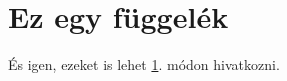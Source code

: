 \documentclass[a4paper, 12pt]{article}
\numberwithin{equation}{section}          %
\numberwithin{figure}{subsection}
\begin{document}

\newpage \vspace*{2cm}

\pagestyle{fancy}

\appendix
\section{Ez egy függelék}
\label{app:fugg}

És igen, ezeket is lehet \ref{app:fugg}. módon hivatkozni.


\end{document}
